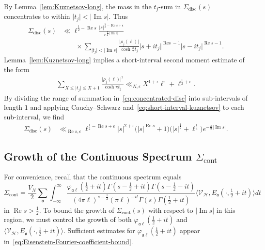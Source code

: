 \documentclass[11pt,reqno]{amsart}
\theoremstyle{plain}
\theoremstyle{definition}
\numberwithin{equation}{section}
\renewcommand{\Im}{\operatorname{Im}}
\renewcommand{\Re}{\operatorname{Re}}
\DeclareMathOperator*{\Res}{Res}
\begin{document}
By Lemma~\ref{lem:Kuznetsov-long}, the mass in the $t_j$-sum in $\Sigma_{\mathrm{disc}}(s)$ concentrates to within $\vert t_j \vert < \vert \Im s \vert$. Thus
\begin{align} \label{eq:concentrated-disc}
	\Sigma_{\mathrm{disc}}(s)
	& \ll \ell^{\frac{1}{2}-\Re s} 
	\frac{\vert s \vert^{\frac{5}{2}-\Re s + \epsilon}}{e^{\frac{\pi}{2} \vert \Im s \vert}} \\
	& \qquad \times 
	\sum_{\vert t_j \vert < \vert \Im s \vert}
		\frac{\vert \rho_j(\ell)\vert}{\cosh \frac{\pi}{2} t_j} 
	\vert s + it_j \vert^{\Res - 1} \vert s - it_j \vert^{\Re s -1}.
\end{align}
Lemma~\ref{lem:Kuznetsov-long} implies a short-interval second moment estimate of the form
\begin{align} \label{eq:short-interval-kuznetsov}
	\sum_{X \leq \vert t_j \vert \leq X+1} 
	\frac{\vert \rho_{j}(\ell) \vert^2}{\cosh \pi t_j }
	\ll_{N,\epsilon} X^{1+\epsilon} \ell^\epsilon + \ell^{\frac{1}{2}+\epsilon}.
\end{align}
By dividing the range of summation in~\eqref{eq:concentrated-disc} into sub-intervals of length $1$ and applying Cauchy--Schwarz and~\eqref{eq:short-interval-kuznetsov} to each sub-interval, we find
\begin{align} \label{eq:discrete-bound}
	\Sigma_{\mathrm{disc}}(s)
	& \ll_{\Re s,\epsilon} \ell^{\frac{1}{2}-\Re s+\epsilon}
	\vert s \vert^{2+\epsilon} 
	\big( \vert s \vert^{\Re s} + 1 \big)
	\big(\vert s \vert^{\frac{1}{2}} + \ell^{\frac{1}{4}}\big)
	e^{-\frac{\pi}{2} \vert \Im s \vert}.
\end{align}

\subsection{Growth of the Continuous Spectrum \texorpdfstring{$\Sigma_{\mathrm{cont}}$}{}}

For convenience, recall that the continuous spectrum equals
\[
\Sigma_{\mathrm{cont}}
		=  \frac{V_N}{2} \sum_\mathfrak{a} \!\!
		\int_{-\infty}^\infty  \!\!
			\frac{\varphi_{\mathfrak{a}\ell}(\frac{1}{2}+it) \Gamma(s-\frac{1}{2}+it)\Gamma(s-\frac{1}{2}-it)}
				{(4\pi \ell)^{s-\frac{1}{2}} (\pi \ell)^{-it} \Gamma(s)\Gamma(\frac{1}{2}+it)}
			\langle \mathcal{V}_\mathcal{H}, E_\mathfrak{a}(\cdot, \tfrac{1}{2}+it) \rangle dt
\]
in $\Re s > \frac{1}{2}$.
To bound the growth of $\Sigma_{\mathrm{cont}}(s)$ with respect to $\vert \Im s \vert$ in this region, we must control the growth of both $\varphi_{\mathfrak{a}\ell}(\frac{1}{2}+it)$ and $\langle \mathcal{V}_\mathcal{H}, E_\mathfrak{a}(\cdot, \tfrac{1}{2}+it) \rangle$.
Sufficient estimates for $\varphi_{\mathfrak{a}\ell}(\frac{1}{2}+it)$ appear in~\eqref{eq:Eisenstein-Fourier-coefficient-bound}.
\end{document}
